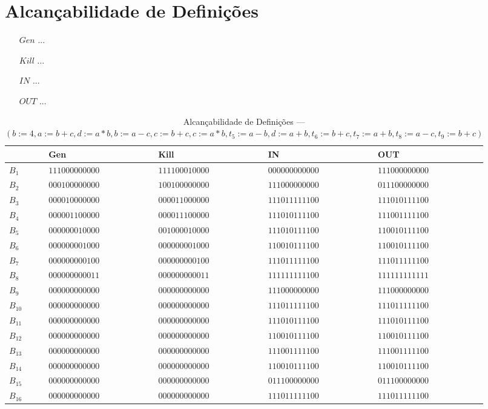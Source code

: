 \section{Alcan\c{c}abilidade de Defini\c{c}\~oes}

\begin{itemize}
  \item[$Gen$] ...
  \item[$Kill$] ...
  \item[$IN$] ...
  \item[$OUT$] ...
\end{itemize}

\begin{table}[ht]
\centering
\begin{tabular}{l|l|l|l|l}
	& Gen & Kill & IN & OUT\\
\hline
$B_{1}$ &  $111000000000$ & $111100010000$ & $000000000000$ & $111000000000$\\
$B_{2}$ &  $000100000000$ & $100100000000$ & $111000000000$ & $011100000000$\\
$B_{3}$ &  $000010000000$ & $000011000000$ & $111011111100$ & $111010111100$\\
$B_{4}$ &  $000001100000$ & $000011100000$ & $111010111100$ & $111001111100$\\
$B_{5}$ &  $000000010000$ & $001000010000$ & $111010111100$ & $110010111100$\\
$B_{6}$ &  $000000001000$ & $000000001000$ & $110010111100$ & $110010111100$\\
$B_{7}$ &  $000000000100$ & $000000000100$ & $111011111100$ & $111011111100$\\
$B_{8}$ &  $000000000011$ & $000000000011$ & $111111111100$ & $111111111111$\\
$B_{9}$ &  $000000000000$ & $000000000000$ & $111000000000$ & $111000000000$\\
$B_{10}$ &  $000000000000$ & $000000000000$ & $111011111100$ & $111011111100$\\
$B_{11}$ &  $000000000000$ & $000000000000$ & $111010111100$ & $111010111100$\\
$B_{12}$ &  $000000000000$ & $000000000000$ & $110010111100$ & $110010111100$\\
$B_{13}$ &  $000000000000$ & $000000000000$ & $111001111100$ & $111001111100$\\
$B_{14}$ &  $000000000000$ & $000000000000$ & $110010111100$ & $110010111100$\\
$B_{15}$ &  $000000000000$ & $000000000000$ & $011100000000$ & $011100000000$\\
$B_{16}$ &  $000000000000$ & $000000000000$ & $111011111100$ & $111011111100$\\
\end{tabular}
\caption{Alcan\c{c}abilidade de Defini\c{c}\~oes --- $(b:=4, a:=b+c, d:=a*b, b:=a-c, c:=b+c, c:=a*b, t_{5}:=a-b, d:=a+b, t_{6}:=b+c, t_{7}:=a+b, t_{8}:=a-c, t_{9}:=b+c)$}
\end{table}

